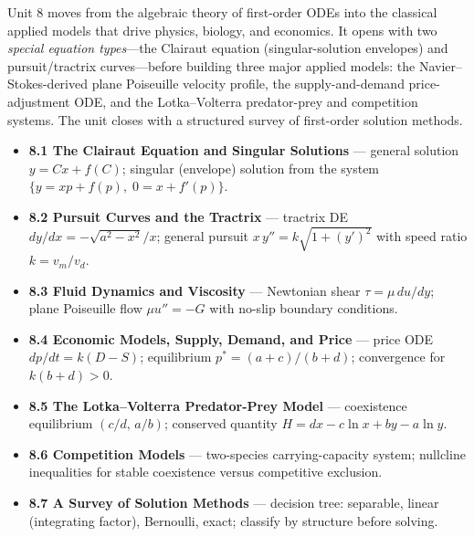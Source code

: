 \begin{topicsbox}
Unit 8 moves from the algebraic theory of first-order ODEs into the classical
applied models that drive physics, biology, and economics. It opens with two
\emph{special equation types}---the Clairaut equation (singular-solution
envelopes) and pursuit/tractrix curves---before building three major applied
models: the Navier--Stokes-derived plane Poiseuille velocity profile, the
supply-and-demand price-adjustment ODE, and the Lotka--Volterra predator-prey
and competition systems. The unit closes with a structured survey of first-order
solution methods.
\begin{itemize}[leftmargin=1.4em, itemsep=3pt]
    \item \textbf{8.1 The Clairaut Equation and Singular Solutions} ---
          general solution $y = Cx + f(C)$; singular (envelope) solution from
          the system $\{y = xp + f(p),\; 0 = x + f'(p)\}$.
    \item \textbf{8.2 Pursuit Curves and the Tractrix} ---
          tractrix DE $dy/dx = -\sqrt{a^2 - x^2}/x$; general pursuit
          $x\,y'' = k\sqrt{1+(y')^2}$ with speed ratio $k = v_m/v_d$.
    \item \textbf{8.3 Fluid Dynamics and Viscosity} ---
          Newtonian shear $\tau = \mu\,du/dy$; plane Poiseuille flow
          $\mu u'' = -G$ with no-slip boundary conditions.
    \item \textbf{8.4 Economic Models, Supply, Demand, and Price} ---
          price ODE $dp/dt = k(D - S)$; equilibrium $p^* = (a+c)/(b+d)$;
          convergence for $k(b+d) > 0$.
    \item \textbf{8.5 The Lotka--Volterra Predator-Prey Model} ---
          coexistence equilibrium $(c/d,\, a/b)$; conserved quantity
          $H = dx - c\ln x + by - a\ln y$.
    \item \textbf{8.6 Competition Models} ---
          two-species carrying-capacity system; nullcline inequalities for
          stable coexistence versus competitive exclusion.
    \item \textbf{8.7 A Survey of Solution Methods} ---
          decision tree: separable, linear (integrating factor), Bernoulli,
          exact; classify by structure before solving.
\end{itemize}
\end{topicsbox}

